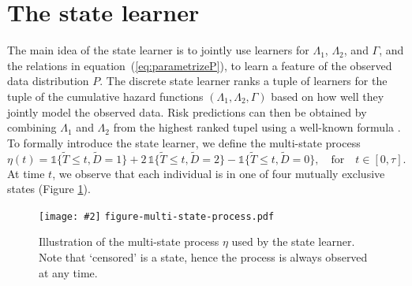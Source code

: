 \documentclass[numsec,webpdf,contemporary,medium,namedate]{oup-authoring-template}%
\theoremstyle{thmstyleone}%
\theoremstyle{thmstyletwo}%
\theoremstyle{thmstylethree}%
\newcommand{\includeFigCond}[2][]{
  \ifx\nofig\undefined %
    \texttt{[image: \#2]} %
  \else %
    \texttt{#2} %
  \fi %
}
\newcommand{\1}{\mathds{1}}
\begin{document}
\section{The state learner}
\label{sec:super-learner-simple}

The main idea of the state learner is to jointly use learners for
\( \Lambda_1 \), \( \Lambda_2 \), and \( \Gamma \), and the relations
in equation~(\ref{eq:parametrizeP}), to learn a feature of the
observed data distribution \( P \). The discrete state learner ranks a
tuple of learners for the tuple of the cumulative hazard functions
\( (\Lambda_1, \Lambda_2, \Gamma) \) based on how well they jointly
model the observed data.  Risk predictions can then be obtained by
combining \( \Lambda_1 \) and $\Lambda_2$ from the highest ranked
tupel using a well-known formula \citep{benichou1990estimates,
  ozenne2017riskregression}. To formally introduce the state learner,
we define the multi-state process
\begin{equation*}
  \eta(t) = \1\{\tilde{T} \leq t, \tilde D=1\} + 2\,\1\{\tilde{T} \leq t, \tilde
  D=2\} - \1\{\tilde{T} \leq t, \tilde D=0\},
  \quad \text{for} \quad t \in [0, \tau].
\end{equation*}
At time \(t\), we observe that each individual is in one of four mutually
exclusive states (Figure \ref{fig:multi-state-process}).

\begin{figure}[h]
  \centering %
  \includeFigCond[width=.5\textwidth]{figure-multi-state-process.pdf}
  \caption{Illustration of the multi-state process \(\eta\) used by
    the state learner. Note that `censored' is a state, hence the
    process is always observed at any time.}
  \label{fig:multi-state-process}
\end{figure}
\end{document}
